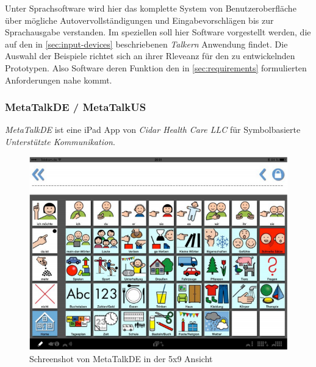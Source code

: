     	Unter Sprachsoftware wird hier das komplette System von Benutzeroberfläche über mögliche Autovervollständigungen und Eingabevorschlägen bis zur Sprachausgabe verstanden. Im speziellen soll hier Software vorgestellt werden, die auf den in \autoref{sec:input-devices} beschriebenen \emph{Talkern} Anwendung findet. Die Auswahl der Beispiele richtet sich an ihrer Rleveanz für den zu entwickelnden Prototypen. Also Software deren Funktion den in \autoref{sec:requirements} formulierten Anforderungen nahe kommt.
        
        \newpage
        \subsubsection*{MetaTalkDE / MetaTalkUS}
        	\emph{MetaTalkDE} ist eine iPad App von \emph{Cidar Health Care LLC} für Symbolbasierte \emph{Unterstützte Kommunikation}.
            
            \begin{figure}[H]
				\centering
				\includegraphics[width=.65\linewidth]{images/Metatalk.png}
                \caption{Schreenshot von MetaTalkDE in der 5x9 Ansicht
                	\parencite[S. 8]{cidar:metaTalkManual}
                }
				\label{fig:metatalk}
			\end{figure}
            
